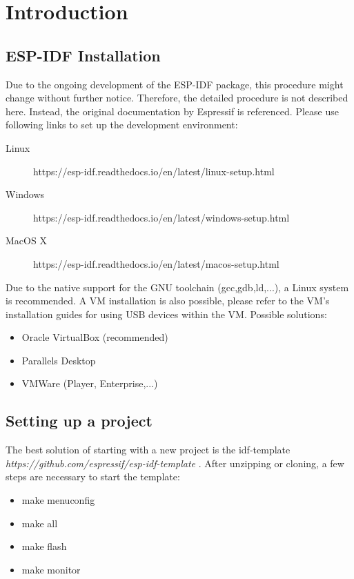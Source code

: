\documentclass[]{scrreprt}%
\begin{document}
\chapter{Introduction}

\section{ESP-IDF Installation}

Due to the ongoing development of the ESP-IDF package, this procedure might change without further notice.
Therefore, the detailed procedure is not described here. Instead, the original documentation by Espressif is referenced.
Please use following links to set up the development environment:

\begin{description}
  \item[Linux] https://esp-idf.readthedocs.io/en/latest/linux-setup.html
  \item[Windows] https://esp-idf.readthedocs.io/en/latest/windows-setup.html 
  \item[MacOS X] https://esp-idf.readthedocs.io/en/latest/macos-setup.html
\end{description}

Due to the native support for the GNU toolchain (gcc,gdb,ld,...), a Linux system is recommended. A VM installation is
also possible, please refer to the VM's installation guides for using USB devices within the VM. Possible solutions:

\begin{itemize}
 \item Oracle VirtualBox (recommended)
 \item Parallels Desktop
 \item VMWare (Player, Enterprise,...)
\end{itemize}



\section{Setting up a project}
\label{sec:setting_up}

The best solution of starting with a new project is the idf-template \textit{https://github.com/espressif/esp-idf-template} \cite{ESP01}.
After unzipping or cloning, a few steps are necessary to start the template:

\begin{itemize}
 \item make menuconfig
 \item make all 
 \item make flash
 \item make monitor
\end{itemize}
\end{document}

